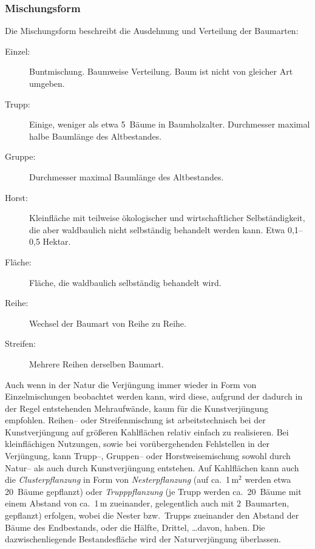 \documentclass[twocolumn]{scrartcl}
\begin{document}
\subsubsection{Mischungsform}
\label{sssec:mischungsform}

Die Mischungsform beschreibt die Ausdehnung und Verteilung der
Baumarten:

\begin{description}
\item[Einzel:] Buntmischung. Baumweise Verteilung. Baum ist nicht von gleicher Art umgeben.
\item[Trupp:] Einige, weniger als etwa 5~Bäume in Baumholzalter. Durchmesser maximal halbe Baumlänge des Altbestandes.
\item[Gruppe:] Durchmesser maximal Baumlänge des Altbestandes.
\item[Horst:] Kleinfläche mit teilweise ökologischer und wirtschaftlicher Selbständigkeit, die aber waldbaulich nicht selbständig behandelt werden kann. Etwa 0,1--0,5 Hektar.
\item[Fläche:] Fläche, die waldbaulich selbständig behandelt wird.
\item[Reihe:] Wechsel der Baumart von Reihe zu Reihe.
\item[Streifen:] Mehrere Reihen derselben Baumart.
\end{description}

Auch wenn in der Natur die Verjüngung immer wieder in Form von Einzelmischungen
beobachtet werden kann, wird diese, aufgrund der dadurch in der Regel
entstehenden Mehraufwände, kaum für die Kunstverjüngung empfohlen. Reihen-- oder
Streifenmischung ist arbeitstechnisch bei der Kunstverjüngung auf größeren
Kahlflächen relativ einfach zu realisieren. Bei kleinflächigen Nutzungen, sowie
bei vorübergehenden Fehlstellen in der Verjüngung, kann Trupp--, Gruppen-- oder
Horstweisemischung sowohl durch Natur-- als auch durch Kunstverjüngung
entstehen. Auf Kahlflächen kann auch die \emph{Clusterpflanzung} in Form von
\emph{Nesterpflanzung} (auf ca.\ 1\,m$^2$ werden etwa 20~Bäume gepflanzt) oder
\emph{Trupppflanzung} (je Trupp werden ca.\ 20~Bäume mit einem Abstand von ca.\
1\,m zueinander, gelegentlich auch mit 2~Baumarten, gepflanzt) erfolgen, wobei
die Nester bzw.\ Trupps zueinander den Abstand der Bäume des Endbestands, oder
die Hälfte, Drittel, \dots davon, haben. Die dazwischenliegende Bestandesfläche
wird der Naturverjüngung überlassen.
\end{document}
